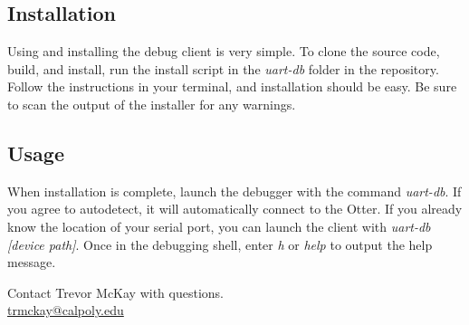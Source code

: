 \documentclass[10pt,a4paper]{article}
\begin{document}
\subsection{Installation}
Using and installing the debug client is very simple. To clone the source code, build, and install,
run the install script in the \emph{uart-db} folder in the repository. Follow the instructions in
your terminal, and installation should be easy. Be sure to scan the output of the installer for
any warnings.

\subsection{Usage}
When installation is complete, launch the debugger with the command \emph{uart-db}. If you agree to
autodetect, it will automatically connect to the Otter. If you already know the location of your
serial port, you can launch the client with \emph{uart-db [device path]}. Once in the debugging shell,
enter \emph{h} or \emph{help} to output the help message.

\vspace*{\fill}
\begin{center}
    \noindent Contact Trevor McKay with questions.\\
    \href{mailto:trmckay@calpoly.edu}{trmckay@calpoly.edu}
\end{center}
\end{document}
